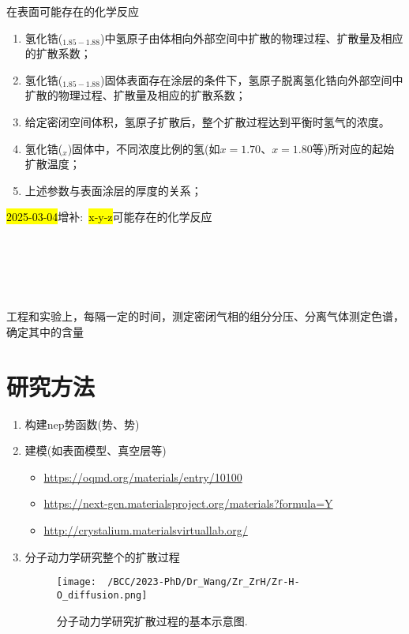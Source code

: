 在表面可能存在的化学反应

\begin{enumerate}
	\item 氢化锆($_{1.85-1.88}$)中氢原子由体相向外部空间中扩散的物理过程、扩散量及相应的扩散系数；

	\item 氢化锆($_{1.85-1.88}$)固体表面存在涂层的条件下，氢原子脱离氢化锆向外部空间中扩散的物理过程、扩散量及相应的扩散系数；

	\item 给定密闭空间体积，氢原子扩散后，整个扩散过程达到平衡时氢气的浓度。

	\item 氢化锆($_x$)固体中，不同浓度比例的氢(如$x=1.70$、$x=1.80$等)所对应的起始扩散温度；

	\item 上述参数与表面涂层的厚度的关系；
\end{enumerate}

\textcolor{red}{\hl{2025-03-04}}增补:~\hl{x-y-z}可能存在的化学反应

{\centering
{}\\
 \\
 \\
\\
}

工程和实验上，每隔一定的时间，测定密闭气相的组分分压、分离气体测定色谱，确定其中的含量

\section{研究方法}
\begin{enumerate}
	\item 构建\textrm{nep}势函数(势、势)

	\item 建模(如表面模型、真空层等)
		\begin{itemize}
			\item \url{https://oqmd.org/materials/entry/10100}
			\item \url{https://next-gen.materialsproject.org/materials?formula=Y}
			\item \url{http://crystalium.materialsvirtuallab.org/}
		\end{itemize}
	\item 分子动力学研究整个的扩散过程
\begin{figure}[!ht]
\centering
\vspace*{-0.05in}
\texttt{[image: ~/BCC/2023-PhD/Dr\_Wang/Zr\_ZrH/Zr-H-O\_diffusion.png]}
\caption{分子动力学研究扩散过程的基本示意图.}
\label{Fig:Zr-H-O_diffusion}
\end{figure}
\end{enumerate}


